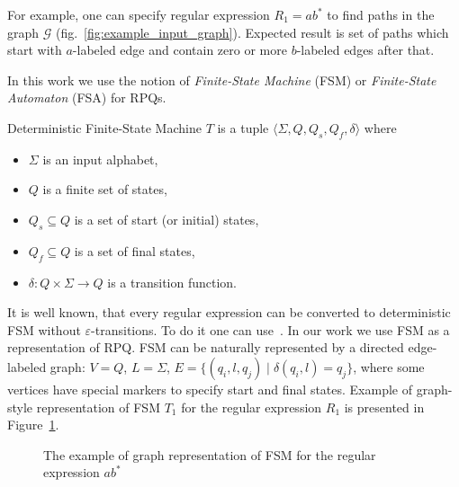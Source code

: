 For example, one can specify regular expression $R_1 = ab^*$ to find paths in the graph $\mathcal{G}$ (fig.~\ref{fig:example_input_graph}). Expected result is set of paths which start with $a$-labeled edge and contain zero or more $b$-labeled edges after that.

In this work we use the notion of \textit{Finite-State Machine} (FSM) or \textit{Finite-State Automaton} (FSA) for RPQs. 

\begin{definition}
Deterministic Finite-State Machine $T$ is a tuple $\langle \Sigma, Q, Q_s, Q_f, \delta \rangle$ where
\begin{itemize}
    \item $\Sigma$ is an input alphabet,
    \item $Q$ is a finite set of states,
    \item $Q_s \subseteq Q$ is a set of start (or initial) states,
    \item $Q_f \subseteq Q$ is a set of final states,
    \item $\delta: Q \times \Sigma \to Q$ is a transition function.
\end{itemize}
\end{definition}

It is well known, that every regular expression can be converted to deterministic FSM without $\varepsilon$-transitions.
To do it one can use~\cite{automata:theory:10.5555/1177300}.
In our work we use FSM as a representation of RPQ. 
FSM can be naturally represented by a directed edge-labeled graph: $V = Q$, $L = \Sigma$, $E = \{(q_i,l,q_j) \mid \delta(q_i,l) = q_j\}$, where some vertices have special markers to specify start and final states. Example of graph-style representation of FSM $T_1$ for the regular expression $R_1$ is presented in Figure~\ref{fig:example_fsm}.

\begin{figure}[h]
    \centering        
    \caption{The example of graph representation of FSM for the regular expression $ab^*$}
    \label{fig:example_fsm}
\end{figure}

